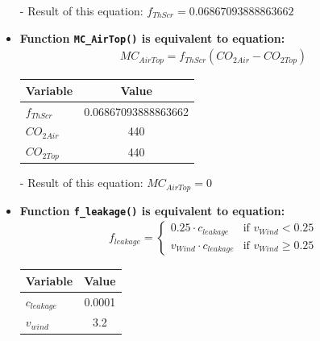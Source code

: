 \documentclass[a4paper]{article}
\numberwithin{equation}{section}
\begin{document}
\begin{itemize}
  \item[-] Result of this equation: \( f_{ThScr} = 0.06867093888863662 \)

  \item \textbf{Function \texttt{MC\_AirTop()} is equivalent to equation:}
        \begin{align*}
          MC_{AirTop} = f_{ThScr} (CO_{2 Air} - CO_{2 Top})
        \end{align*}

        \begin{table}[H]
          \centering
          \begin{tabular}{@{}lS[table-format=3.16]@{}}
            \toprule
            \textbf{Variable} & \textbf{Value}      \\
            \midrule
            \( f_{ThScr} \)     & 0.06867093888863662 \\
            \( CO_{2 Air} \)    & 440                 \\
            \( CO_{2 Top} \)    & 440                 \\
            \bottomrule
          \end{tabular}
        \end{table}

  \item[-] Result of this equation: \( MC_{AirTop} = 0 \)

  \item \textbf{Function \texttt{f\_leakage()} is equivalent to equation:}
        \begin{align*}
          f_{leakage} = \begin{cases}
            0.25 \cdot c_{leakage}     & \text{if~} v_{Wind} < 0.25    \\
            v_{Wind} \cdot c_{leakage} & \text{if~} v_{Wind} \geq 0.25
          \end{cases}
        \end{align*}

        \begin{table}[H]
          \centering
          \begin{tabular}{@{}lS[table-format=1.4]@{}}
            \toprule
            \textbf{Variable} & \textbf{Value} \\
            \midrule
            \( c_{leakage} \)   & 0.0001         \\
            \( v_{wind} \)      & 3.2            \\
            \bottomrule
          \end{tabular}
        \end{table}


\end{itemize}
\end{document}
